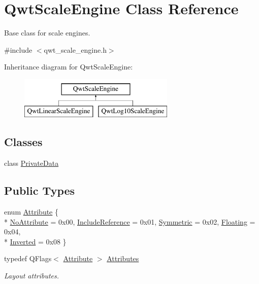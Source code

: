\hypertarget{class_qwt_scale_engine}{\section{Qwt\-Scale\-Engine Class Reference}
\label{class_qwt_scale_engine}
}


Base class for scale engines.  




{\ttfamily \#include $<$qwt\-\_\-scale\-\_\-engine.\-h$>$}

Inheritance diagram for Qwt\-Scale\-Engine\-:\begin{figure}[H]
\begin{center}
\leavevmode
\includegraphics[height=2.000000cm]{class_qwt_scale_engine}
\end{center}
\end{figure}
\subsection*{Classes}
\begin{DoxyCompactItemize}
\item 
class \hyperlink{class_qwt_scale_engine_1_1_private_data}{Private\-Data}
\end{DoxyCompactItemize}
\subsection*{Public Types}
\begin{DoxyCompactItemize}
\item 
enum \hyperlink{class_qwt_scale_engine_a7548418e0896d75eec164bfa2ba3ff5f}{Attribute} \{ \\*
\hyperlink{class_qwt_scale_engine_a7548418e0896d75eec164bfa2ba3ff5fa617f0da0b90080be49b79dbaaab191f8}{No\-Attribute} = 0x00, 
\hyperlink{class_qwt_scale_engine_a7548418e0896d75eec164bfa2ba3ff5fad29dea0ac58c4675ac009620b0857984}{Include\-Reference} = 0x01, 
\hyperlink{class_qwt_scale_engine_a7548418e0896d75eec164bfa2ba3ff5fab3931d404b68708d0c6eaf87ae744fc9}{Symmetric} = 0x02, 
\hyperlink{class_qwt_scale_engine_a7548418e0896d75eec164bfa2ba3ff5fa2158d4b3596e7d4a00375821fc0d20c3}{Floating} = 0x04, 
\\*
\hyperlink{class_qwt_scale_engine_a7548418e0896d75eec164bfa2ba3ff5fa2f3985208684d394319320b8e67ea062}{Inverted} = 0x08
 \}
\item 
typedef Q\-Flags$<$ \hyperlink{class_qwt_scale_engine_a7548418e0896d75eec164bfa2ba3ff5f}{Attribute} $>$ \hyperlink{class_qwt_scale_engine_a798f5f1420019d33baa799d26bca0255}{Attributes}
\begin{DoxyCompactList}\small\item\em Layout attributes. \end{DoxyCompactList}\end{DoxyCompactItemize}
